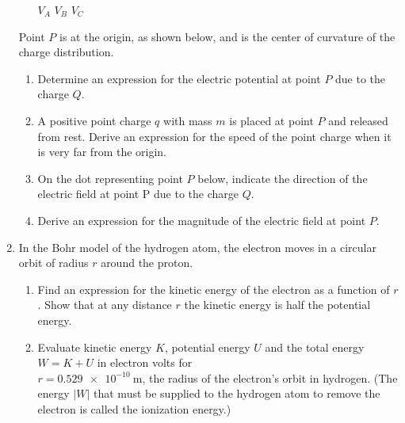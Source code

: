 \documentclass{../../../oss-apphys}
\begin{document}
\begin{enumerate}
\begin{enumerate}
    \vspace{.1in}
    \underline{\hspace{.3in} } $V_A$ \hspace{.3in}
    \underline{\hspace{.3in} } $V_B$ \hspace{.3in}
    \underline{\hspace{.3in} } $V_C$
  \end{enumerate}
  Point $P$ is at the origin, as shown below, and is the center of curvature of
  the charge distribution.
  \begin{enumerate}[resume]
  \item Determine an expression for the electric potential at point $P$ due to
    the charge $Q$.
  \item A positive point charge $q$ with mass $m$ is placed at point $P$ and
    released from rest. Derive an expression for the speed of the point charge
    when it is very far from the origin.
    
  \item On the dot representing point $P$ below, indicate the direction of the
    electric field at point P due to the charge $Q$.
    \begin{center}
    \end{center}
  \item Derive an expression for the magnitude of the electric field at point
    $P$.
  \end{enumerate}
  \vspace{2in}
  \newpage
  
\item In the Bohr model of the hydrogen atom, the electron moves in a circular
  orbit of radius $r$ around the proton.
  \begin{enumerate}
  \item Find an expression for the kinetic energy of the electron as a function
    of $r$. Show that at any distance $r$ the kinetic energy is half the
    potential energy.
  \item Evaluate kinetic energy $K$, potential energy $U$ and the total
    energy $W=K+U$ in electron volts for\\ $r=\SI{0.529e-10}{\metre}$, the
    radius of the electron's orbit in hydrogen. (The energy $|W|$ that must be
    supplied to the hydrogen atom to remove the electron is called the
    ionization energy.)
  \end{enumerate}
  \newpage


\end{enumerate}
\end{document}
